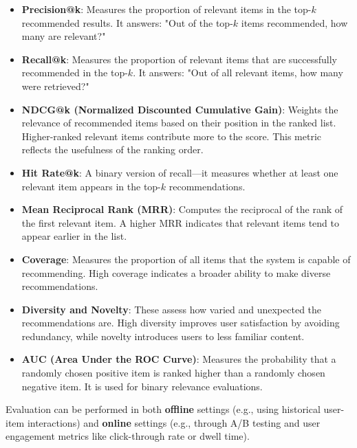 \documentclass[11pt]{article}
\begin{document}
\begin{itemize}
	\item \textbf{Precision@k}: Measures the proportion of relevant items in the top-\(k\) recommended results. It answers: "Out of the top-\(k\) items recommended, how many are relevant?"

	\item \textbf{Recall@k}: Measures the proportion of relevant items that are successfully recommended in the top-\(k\). It answers: "Out of all relevant items, how many were retrieved?"

	\item \textbf{NDCG@k (Normalized Discounted Cumulative Gain)}: Weights the relevance of recommended items based on their position in the ranked list. Higher-ranked relevant items contribute more to the score. This metric reflects the usefulness of the ranking order.

	\item \textbf{Hit Rate@k}: A binary version of recall—it measures whether at least one relevant item appears in the top-\(k\) recommendations.

	\item \textbf{Mean Reciprocal Rank (MRR)}: Computes the reciprocal of the rank of the first relevant item. A higher MRR indicates that relevant items tend to appear earlier in the list.

	\item \textbf{Coverage}: Measures the proportion of all items that the system is capable of recommending. High coverage indicates a broader ability to make diverse recommendations.

	\item \textbf{Diversity and Novelty}: These assess how varied and unexpected the recommendations are. High diversity improves user satisfaction by avoiding redundancy, while novelty introduces users to less familiar content.

	\item \textbf{AUC (Area Under the ROC Curve)}: Measures the probability that a randomly chosen positive item is ranked higher than a randomly chosen negative item. It is used for binary relevance evaluations.

\end{itemize}

Evaluation can be performed in both \textbf{offline} settings (e.g., using historical user-item interactions) and \textbf{online} settings (e.g., through A/B testing and user engagement metrics like click-through rate or dwell time).
\end{document}
